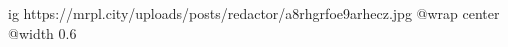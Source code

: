  
 
 
 
 

\ifcmt
  ig https://mrpl.city/uploads/posts/redactor/a8rhgrfoe9arhecz.jpg
  @wrap center
  @width 0.6
\fi
